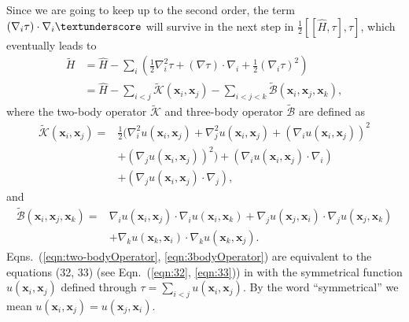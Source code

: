 Since we are going to keep up to the second order, the term $(\nabla_i\tau)\cdot\nabla_i\textunderscore$ will survive in the next step in $\frac{1}{2}\left[[\hat{H},\tau],\tau\right]$, which eventually leads to
\begin{equation}
    \begin{split}
        \tilde{H}&=\hat{H}-\sum_i\left(\frac{1}{2}\nabla_i^2\tau+(\nabla\tau)\cdot\nabla_i+\frac{1}{2}(\nabla_i\tau)^2\right)\\
        &=\hat{H}-\sum_{i<j}\tilde{\mathcal{K}}(\mathbf{x}_i,\mathbf{x}_j)-\sum_{i<j<k}\tilde{\mathcal{B}}(\mathbf{x}_i,\mathbf{x}_j,\mathbf{x}_k),
    \end{split}
    \label{eqn:Hwith2&3bodies}
\end{equation}
where the two-body operator $\tilde{\mathcal{K}}$ and three-body operator $\tilde{\mathcal{B}}$ are defined as
\begin{equation}
    \begin{split}
        \tilde{\mathcal{K}}(\mathbf{x}_i,\mathbf{x}_j)=&\frac{1}{2}\big(\nabla_i^2u(\mathbf{x}_i,\mathbf{x}_j)+\nabla_j^2u(\mathbf{x}_i,\mathbf{x}_j)+(\nabla_iu(\mathbf{x}_i,\mathbf{x}_j))^2 \\
        &+(\nabla_ju(\mathbf{x}_i,\mathbf{x}_j))^2\big)+(\nabla_iu(\mathbf{x}_i,\mathbf{x}_j)\cdot\nabla_i)\\
        &+(\nabla_ju(\mathbf{x}_i,\mathbf{x}_j)\cdot\nabla_j),
    \end{split}
    \label{eqn:two-bodyOperator}
\end{equation}
and
\begin{equation}
    \begin{split}
        \tilde{\mathcal{B}}(\mathbf{x}_i,\mathbf{x}_j,\mathbf{x}_k)=&\nabla_iu(\mathbf{x}_i,\mathbf{x}_j)\cdot\nabla_iu(\mathbf{x}_i,\mathbf{x}_k)+\nabla_ju(\mathbf{x}_j,\mathbf{x}_i)\cdot\nabla_ju(\mathbf{x}_j,\mathbf{x}_k)\\
        &+\nabla_ku(\mathbf{x}_k,\mathbf{x}_i)\cdot\nabla_ku(\mathbf{x}_k,\mathbf{x}_j).
    \end{split}
    \label{eqn:3bodyOperator}
\end{equation}
Eqns.~(\ref{eqn:two-bodyOperator}, \ref{eqn:3bodyOperator}) are equivalent to the equations (32, 33) (see Eqn.~(\ref{eqn:32}, \ref{eqn:33})) in \cite{feniou2025realspacechemistryquantumcomputers} with the symmetrical function $u(\mathbf{x}_i,\mathbf{x}_j)$ defined through $\tau=\sum_{i<j}u(\mathbf{x}_i,\mathbf{x}_j)$. By the word ``symmetrical'' we mean $u(\mathbf{x}_i,\mathbf{x}_j)=u(\mathbf{x}_j,\mathbf{x}_i)$.


